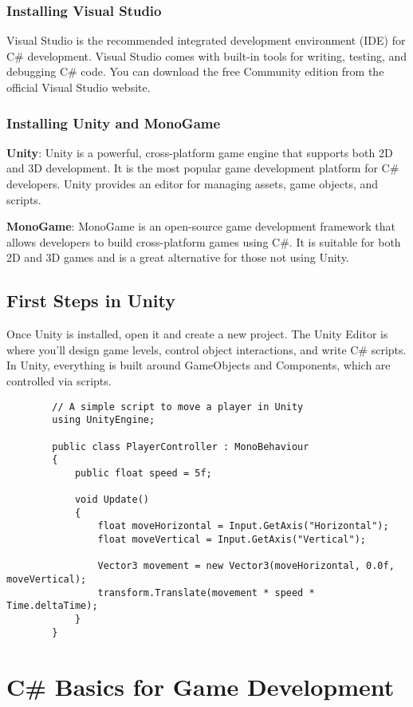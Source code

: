 \documentclass[a4paper,12pt]{book}
\begin{document}
	\subsection{Installing Visual Studio}
	Visual Studio is the recommended integrated development environment (IDE) for C\# development. Visual Studio comes with built-in tools for writing, testing, and debugging C\# code. You can download the free Community edition from the official Visual Studio website.
	
	\subsection{Installing Unity and MonoGame}
	\textbf{Unity}: Unity is a powerful, cross-platform game engine that supports both 2D and 3D development. It is the most popular game development platform for C\# developers. Unity provides an editor for managing assets, game objects, and scripts.
	
	\textbf{MonoGame}: MonoGame is an open-source game development framework that allows developers to build cross-platform games using C\#. It is suitable for both 2D and 3D games and is a great alternative for those not using Unity.
	
	\section{First Steps in Unity}
	Once Unity is installed, open it and create a new project. The Unity Editor is where you'll design game levels, control object interactions, and write C\# scripts. In Unity, everything is built around GameObjects and Components, which are controlled via scripts.
	
	\begin{lstlisting}
		// A simple script to move a player in Unity
		using UnityEngine;
		
		public class PlayerController : MonoBehaviour
		{
			public float speed = 5f;
			
			void Update()
			{
				float moveHorizontal = Input.GetAxis("Horizontal");
				float moveVertical = Input.GetAxis("Vertical");
				
				Vector3 movement = new Vector3(moveHorizontal, 0.0f, moveVertical);
				transform.Translate(movement * speed * Time.deltaTime);
			}
		}
	\end{lstlisting}
	
	\chapter{C\# Basics for Game Development}
\end{document}
